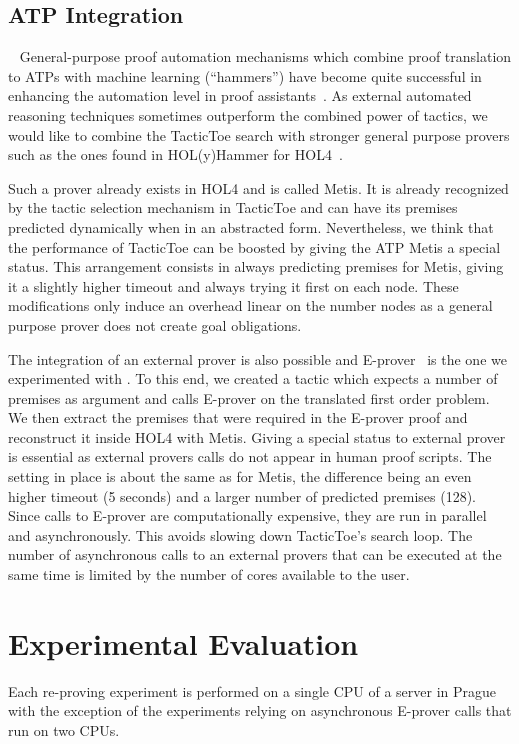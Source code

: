 \documentclass[runningheads,a4paper,draft]{svjour3}
\def\holfour{\textsf{HOL4}\xspace}
\def\eprover{\textsf{E-prover}\xspace}
\def\holyhammer{\textsf{HOL(y)Hammer}\xspace}
\def\metis{\textsf{Metis}\xspace}
\def\tactictoe{\textsf{TacticToe}\xspace}
\begin{document}
\subsection{ATP Integration}~\label{sec:atp}
General-purpose proof automation mechanisms which combine proof translation to
ATPs with machine learning (``hammers'') have become quite successful in
enhancing the automation level in proof assistants~\cite{hammers4qed}.
As external automated reasoning techniques sometimes outperform the combined
power of tactics, we would like to combine the \tactictoe search with
stronger general purpose provers such as the ones found in \holyhammer for
\holfour~\cite{tgck-cpp15}.

Such a prover already exists in \holfour and is called \metis. It is already
recognized by the tactic selection mechanism in \tactictoe and can have its
premises predicted dynamically when in an abstracted form. Nevertheless,
we think that the performance of \tactictoe can be boosted by giving the ATP
\metis a special status. This arrangement consists in always predicting
premises for \metis, giving it a slightly higher timeout and
always trying it first on each node. These modifications only induce an
overhead linear on the number nodes as a general purpose prover does not create
goal obligations.

The integration of an external prover is also possible and
\eprover~\cite{eprover} is the one we experimented with .
To this end, we created a tactic which expects a number of premises as argument
and calls \eprover on the translated first order problem. We then extract the
premises that were required in the \eprover
proof and reconstruct it inside \holfour with \metis. Giving a special status
to external
prover is essential as external provers calls do not appear in human
proof scripts. The setting in place is about the same as for \metis, the
difference being an even higher timeout (5 seconds) and a larger number of
predicted premises (128). Since calls to \eprover are
computationally expensive, they are run in parallel and asynchronously. This
avoids slowing down \tactictoe's search loop. The number of asynchronous calls
to an external provers that can be executed at the same time is limited by the
number of cores available to the user.


\section{Experimental Evaluation}\label{s:experiments}
Each re-proving experiment is performed on a single CPU of a server in Prague
with the exception of the experiments
relying on asynchronous \eprover calls that run on two CPUs.
\end{document}
